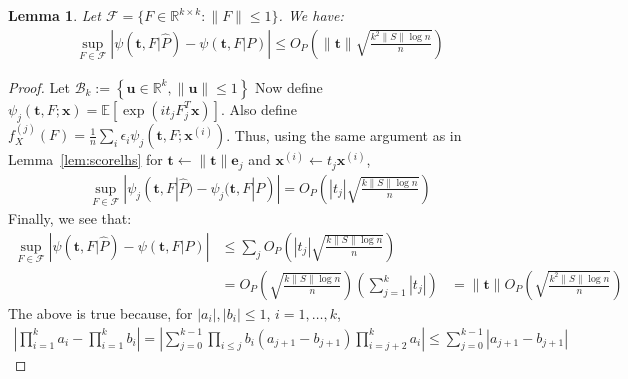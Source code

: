 \documentclass[10pt,a4paper]{amsart}
\newtheorem{lemma}{Lemma}
\newcommand{\E}{\mathbb{E}}
\newcommand{\bas}[1]{\begin{align*}#1\end{align*}}
\newcommand{\bb}[1]{\left(#1\right)}
\newcommand{\be}{\pmb{e}}
\newcommand{\bk}{\color{black}}
\newcommand{\bt}{\pmb{t}}
\newcommand{\bu}{\pmb{u}}
\newcommand{\bx}{\pmb{x}}
\newcommand{\norm}[1]{\left\|#1\right\|}
\newcommand{\nt}{\|\bt\|}
\newcommand{\rd}{\color{red}}
\begin{document}
\begin{lemma}\label{lem:scorerhs}
Let $\mathcal{F}=\{F\in \mathbb{R}^{k\times k}:\|F\|\leq 1\}$. We have:
\bas{
    \sup_{F\in \mathcal{F}}\left|\psi(\bt,F|\hat{P})-\psi(\bt,F|P)\right|\leq  O_P\bb{\nt\sqrt{\frac{k^2\|S\|\log n}{n}}}
}
\end{lemma}

\begin{proof}
Let $\mathcal{B}_{k} := \left\{\bu \in \mathbb{R}^{k}, \norm{\bu}\leq1\right\}$
Now define $\psi_j(\bt,F;\bx)=\E[\exp(it_j F_j^T\bx)]$. Also define $f^{(j)}_X(F)=\frac{1}{n}\sum_i\epsilon_i \psi_j(\bt,F;\bx^{\bb{i}})$. 
Thus, using the same argument as in Lemma~\ref{lem:scorelhs} for $\bt \leftarrow \nt\be_{j}$ and $\bx^{\bb{i}} \leftarrow t_{j}\bx^{\bb{i}}$, 
\bas{\sup_{F\in \mathcal{F}}|\psi_j(\bt,F|\hat{P})-\psi_j(\bt,F|P)|=O_P\bb{|t_{j}|\sqrt{\frac{k\|S\|\log n}{n}}}
}
Finally, we see that:
\bas{
\sup_{F\in \mathcal{F}}\left|\psi(\bt,F|\hat{P})-\psi(\bt,F|P)\right| &\leq \sum_j  O_P\bb{|t_j|\sqrt{\frac{k\|S\|\log n}{n}}}\\
&= O_P\bb{\sqrt{\frac{k\|S\|\log n}{n}}}\bb{\sum_{j=1}^{k}|t_j|} 
&= \nt O_P\bb{\sqrt{\frac{k^2\|S\|\log n}{n}}}
}
The above is true because, for $|a_i|,|b_i|\leq 1$, $i=1,\dots, k$,
\bas{
\left|\prod_{i=1}^k a_i-\prod_{i=1}^k b_i\right|=\left|\sum_{j=0}^{k-1} \prod_{i\leq j}
b_i (a_{j+1}-b_{j+1})\prod_{i=j+2}^k
a_i\right| \leq \sum_{j=0}^{k-1}|a_{j+1}-b_{j+1}| %
}
\end{proof}
\end{document}
